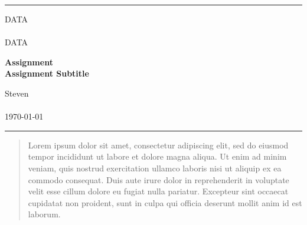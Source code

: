 \documentclass[a4paper, 11pt]{article} %
\begin{document}

\fancyhead[C]{}
\hrule \medskip %
\begin{minipage}{0.295\textwidth} %
    \raggedright
    DATA\\ %
    \footnotesize %
    \hfill\\
    DATA\\ %
\end{minipage}
\begin{minipage}{0.4\textwidth} %
    \centering
    \large %
    \textbf{Assignment}\\ %
    \normalsize %
    \textbf{Assignment Subtitle}\\ %
\end{minipage}
\begin{minipage}{0.295\textwidth} %
    \raggedleft
    Steven\\ %
    \footnotesize %
    \hfill\\
    \today\\ %
\end{minipage}
\medskip\hrule %
\bigskip


\begin{abstract}

    Lorem ipsum dolor sit amet, consectetur adipiscing elit, sed do eiusmod tempor
    incididunt ut labore et dolore magna aliqua. Ut enim ad minim veniam, quis nostrud
    exercitation ullamco laboris nisi ut aliquip ex ea commodo consequat. Duis aute irure
    dolor in reprehenderit in voluptate velit esse cillum dolore eu fugiat nulla pariatur.
    Excepteur sint occaecat cupidatat non proident, sunt in culpa qui officia deserunt
    mollit anim id est laborum.

\end{abstract}

\bigskip

\end{document}
